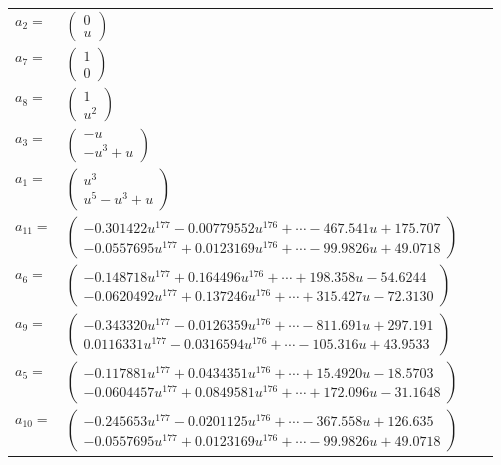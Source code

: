\documentclass[1p]{elsarticle_modified}
\theoremstyle{definition}
\begin{document}
\begin{tabular}{m{7pt} m{180pt} m{7pt} m{180pt} }
\flushright $a_{2}=$&$\begin{pmatrix}0\\u\end{pmatrix}$ \\
\flushright $a_{7}=$&$\begin{pmatrix}1\\0\end{pmatrix}$ \\
\flushright $a_{8}=$&$\begin{pmatrix}1\\u^2\end{pmatrix}$ \\
\flushright $a_{3}=$&$\begin{pmatrix}- u\\- u^3+u\end{pmatrix}$ \\
\flushright $a_{1}=$&$\begin{pmatrix}u^3\\u^5- u^3+u\end{pmatrix}$ \\
\flushright $a_{11}=$&$\begin{pmatrix}-0.301422 u^{177}-0.00779552 u^{176}+\cdots-467.541 u+175.707\\-0.0557695 u^{177}+0.0123169 u^{176}+\cdots-99.9826 u+49.0718\end{pmatrix}$ \\
\flushright $a_{6}=$&$\begin{pmatrix}-0.148718 u^{177}+0.164496 u^{176}+\cdots+198.358 u-54.6244\\-0.0620492 u^{177}+0.137246 u^{176}+\cdots+315.427 u-72.3130\end{pmatrix}$ \\
\flushright $a_{9}=$&$\begin{pmatrix}-0.343320 u^{177}-0.0126359 u^{176}+\cdots-811.691 u+297.191\\0.0116331 u^{177}-0.0316594 u^{176}+\cdots-105.316 u+43.9533\end{pmatrix}$ \\
\flushright $a_{5}=$&$\begin{pmatrix}-0.117881 u^{177}+0.0434351 u^{176}+\cdots+15.4920 u-18.5703\\-0.0604457 u^{177}+0.0849581 u^{176}+\cdots+172.096 u-31.1648\end{pmatrix}$ \\
\flushright $a_{10}=$&$\begin{pmatrix}-0.245653 u^{177}-0.0201125 u^{176}+\cdots-367.558 u+126.635\\-0.0557695 u^{177}+0.0123169 u^{176}+\cdots-99.9826 u+49.0718\end{pmatrix}$ \\

\end{tabular}
\end{document}
